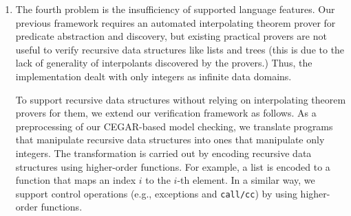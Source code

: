\begin{enumerate}
%


%
%

\item The fourth problem is the insufficiency of supported language
      features.  Our previous framework requires an automated
      interpolating theorem prover for predicate abstraction and
      discovery, but existing practical provers are not useful to verify
      recursive data structures like lists and trees (this is due to
      the lack of generality of interpolants discovered by the provers.)
      Thus, the implementation dealt with only integers as infinite data
      domains.

      To support recursive data structures without relying on
      interpolating theorem provers for them, we extend our verification
      framework as follows.  As a preprocessing of our CEGAR-based model
      checking, we translate programs that manipulate recursive data
      structures into ones that manipulate only integers.  The
      transformation is carried out by encoding recursive data
      structures using higher-order functions.  For example, a list is
      encoded to a function that maps an index $i$ to the $i$-th
      element.  In a similar way, we support control operations (e.g.,
      exceptions and \texttt{call/cc}) by using higher-order functions.
\end{enumerate}
\vspace{-5pt}


